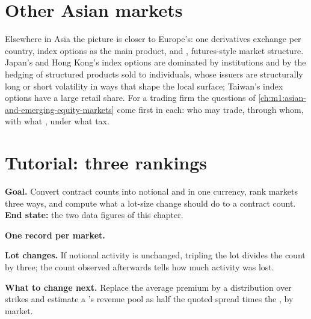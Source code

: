 \section{Other Asian markets}

Elsewhere in Asia the picture is closer to Europe's: one derivatives exchange
per country, index options as the main product,  and , futures-style market structure. Japan's and Hong Kong's index
options are dominated by institutions and by the hedging of structured
products sold to individuals, whose issuers are structurally long or short
volatility in ways that shape the local surface; Taiwan's index options have
a large retail share. For a trading firm the questions of
\cref{ch:m1:asian-and-emerging-equity-markets} come first in each: who may
trade, through whom, with what , under what tax.

\section{Tutorial: three rankings}\label{tut:m1:options-markets-europe-asia:rankings}

\begin{tutorial}
\textbf{Goal.} Convert contract counts into notional and  in
one currency, rank markets three ways, and compute what a lot-size change
should do to a contract count. \textbf{End state:} the two data figures of
this chapter.
\begin{tutsteps}
\item \textbf{One record per market.}
\label{lst:m1:options-markets-europe-asia:stats}
\item \textbf{Lot changes.} If notional activity is unchanged, tripling the
lot divides the count by three; the count observed afterwards tells how much
activity was lost.
\label{lst:m1:options-markets-europe-asia:lot}
\end{tutsteps}
\textbf{What to change next.} Replace the average premium by a distribution
over strikes and estimate a 's revenue pool as half the quoted
spread times the , by market.
\end{tutorial}

